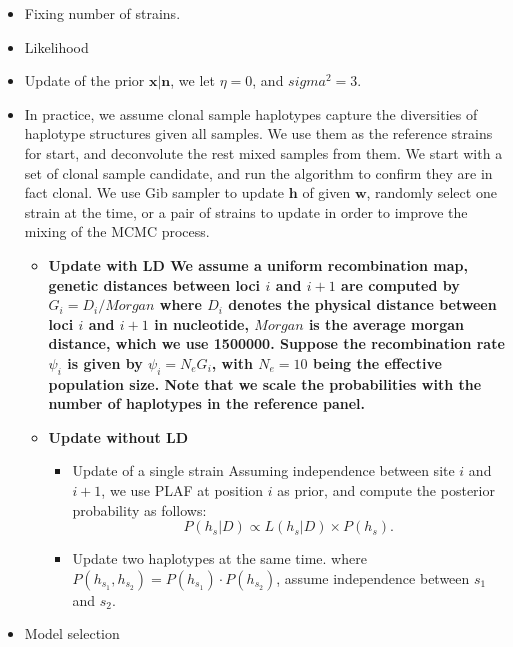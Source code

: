 \documentclass{bioinfo}
\begin{document}
\begin{itemize}
\item Fixing number of strains.
\item Likelihood
\item Update of the prior $\mathbf{x|n}$, we let $\eta = 0$, and $sigma^2 = 3$.
\item
In practice, we assume clonal sample haplotypes capture the diversities of haplotype structures given all samples. We use them as the reference strains for start, and deconvolute the rest mixed samples from them. We start with a set of clonal sample candidate, and run the algorithm to confirm they are in fact clonal. We use Gib sampler to update $\mathbf h$ of given $\mathbf w$, randomly select one strain at the time, or a pair of strains to update in order to improve the mixing of the MCMC process.

\begin{itemize}
\item \bf{Update with LD} We assume a uniform recombination map, genetic distances between loci $i$ and $i+1$ are computed by $G_i = D_i / Morgan$ where $D_i$ denotes the physical distance between loci $i$ and $i+1$ in nucleotide, $Morgan$ is the average morgan distance, which we use 1500000. Suppose the recombination rate $\psi_i$ is given by $\psi_i = N_e G_i$, with $N_e=10$ being the effective population size. Note that {\bf we scale the probabilities with the number of haplotypes in the reference panel}.
\item \bf{Update without LD}
\begin{itemize}
\item Update of a single strain
Assuming independence between site $i$ and $i+1$, we use PLAF at position $i$ as prior, and compute the posterior probability as follows:
\begin{equation}
P(h_s | D) \propto L(h_s|D) \times P(h_s).\label{eqn:post:LDfree}
\end{equation}

\item Update two haplotypes at the same time.
where $P(h_{s_1},h_{s_2}) = P(h_{s_1}) \cdot P(h_{s_2})$, assume independence between $s_1$ and $s_2$.
\end{itemize}
\end{itemize}


\item Model selection


\end{itemize}
\end{document}
